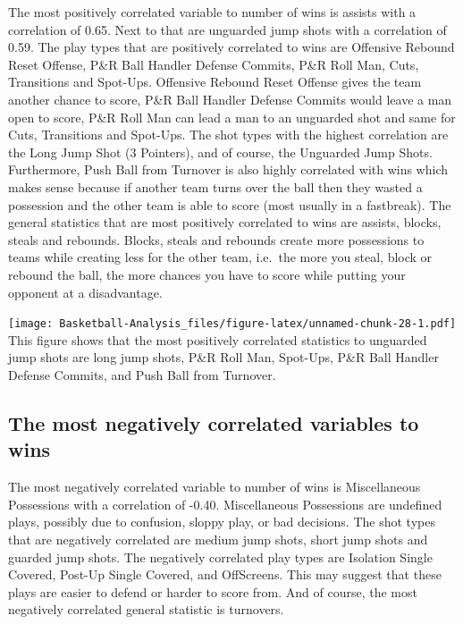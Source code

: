 \documentclass[]{book}
\begin{document}
The most positively correlated variable to number of wins is assists with a correlation of 0.65. Next to that are unguarded jump shots with a correlation of 0.59.
The play types that are positively correlated to wins are Offensive Rebound Reset Offense, P\&R Ball Handler Defense Commits, P\&R Roll Man, Cuts, Transitions and Spot-Ups. Offensive Rebound Reset Offense gives the team another chance to score, P\&R Ball Handler Defense Commits would leave a man open to score, P\&R Roll Man can lead a man to an unguarded shot and same for Cuts, Transitions and Spot-Ups.
The shot types with the highest correlation are the Long Jump Shot (3 Pointers), and of course, the Unguarded Jump Shots.
Furthermore, Push Ball from Turnover is also highly correlated with wins which makes sense because if another team turns over the ball then they wasted a possession and the other team is able to score (most usually in a fastbreak).
The general statistics that are most positively correlated to wins are assists, blocks, steals and rebounds. Blocks, steals and rebounds create more possessions to teams while creating less for the other team, i.e.~the more you steal, block or rebound the ball, the more chances you have to score while putting your opponent at a disadvantage.

\texttt{[image: Basketball-Analysis\_files/figure-latex/unnamed-chunk-28-1.pdf]}
This figure shows that the most positively correlated statistics to unguarded jump shots are long jump shots, P\&R Roll Man, Spot-Ups, P\&R Ball Handler Defense Commits, and Push Ball from Turnover.

\hypertarget{the-most-negatively-correlated-variables-to-wins}{%
\subsection{The most negatively correlated variables to wins}\label{the-most-negatively-correlated-variables-to-wins}}

The most negatively correlated variable to number of wins is Miscellaneous Possessions with a correlation of -0.40. Miscellaneous Possessions are undefined plays, possibly due to confusion, sloppy play, or bad decisions. The shot types that are negatively correlated are medium jump shots, short jump shots and guarded jump shots. The negatively correlated play types are Isolation Single Covered, Post-Up Single Covered, and OffScreens. This may suggest that these plays are easier to defend or harder to score from.
And of course, the most negatively correlated general statistic is turnovers.
\end{document}
